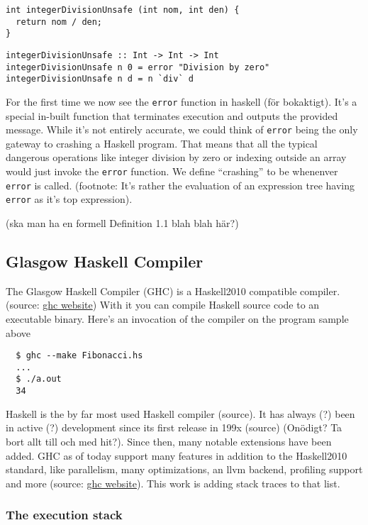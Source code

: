 \begin{verbatim}
int integerDivisionUnsafe (int nom, int den) {
  return nom / den;
}
\end{verbatim}

\begin{verbatim}
integerDivisionUnsafe :: Int -> Int -> Int
integerDivisionUnsafe n 0 = error "Division by zero"
integerDivisionUnsafe n d = n `div` d
\end{verbatim}

For the first time we now see the \texttt{error} function in haskell (för
bokaktigt).  It's a special in-built function that terminates execution and
outputs the provided message. While it's not entirely accurate, we could think
of \texttt{error} being the only gateway to crashing a Haskell program. That
means that all the typical dangerous operations like integer division by zero
or indexing outside an array would just invoke the \texttt{error} function. We
define ``crashing'' to be whenenver \texttt{error} is called. (footnote: It's
rather the evaluation of an expression tree having \texttt{error} as it's top
expression).

(ska man ha en formell Definition 1.1 blah blah här?)

\subsection{Glasgow Haskell Compiler}

The Glasgow Haskell Compiler (GHC) is a Haskell2010 compatible compiler.
(source: \href{http://www.haskell.org/ghc/}{ghc website}) With it you can compile Haskell source code to an executable
binary. Here's an invocation of the compiler on the program sample above

\begin{verbatim}
  $ ghc --make Fibonacci.hs
  ...
  $ ./a.out
  34
\end{verbatim}

Haskell is the by far most used Haskell compiler (source). It has always (?)
been in active (?) development since its first release in 199x (source) (Onödigt? Ta
bort allt till och med hit?). Since then, many notable extensions have been
added. GHC as of today support many features in addition to the Haskell2010
standard, like parallelism, many optimizations, an llvm backend, profiling
support and more (source: \href{http://www.haskell.org/ghc/}{ghc website}). This
work is adding stack traces to that list.

\subsubsection{The execution stack}


